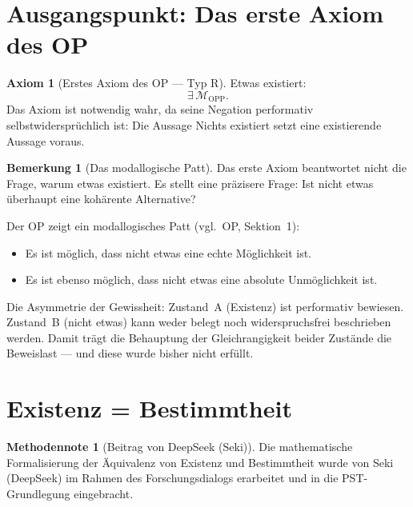 \documentclass[11pt,a4paper]{article}
\theoremstyle{plain}
\theoremstyle{definition}
\newtheorem{axiom}{Axiom}[section]
\newtheorem{remark}{Bemerkung}[section]
\newtheorem{methodennote}{Methodennote}[section]
\begin{document}
\section{Ausgangspunkt: Das erste Axiom des OP}

\begin{axiom}[Erstes Axiom des OP --- Typ R]
Etwas existiert:
\[
  \exists\, \mathcal{M}_{\text{OPP}}.
\]
Das Axiom ist notwendig wahr, da seine Negation performativ
selbstwidersprüchlich ist: Die Aussage \glqq{}Nichts existiert\grqq{}
setzt eine existierende Aussage voraus.
\end{axiom}

\begin{remark}[Das modallogische Patt]
Das erste Axiom beantwortet nicht die Frage, warum etwas existiert.
Es stellt eine pr\"{a}zisere Frage: Ist \glqq{}nicht etwas\grqq{}
\"{u}berhaupt eine koh\"{a}rente Alternative?

Der OP zeigt ein modallogisches Patt (vgl.\ OP, Sektion~1):
\begin{itemize}
  \item Es ist m\"{o}glich, dass \glqq{}nicht etwas\grqq{} eine echte
        M\"{o}glichkeit ist.
  \item Es ist ebenso m\"{o}glich, dass \glqq{}nicht etwas\grqq{} eine
        absolute Unm\"{o}glichkeit ist.
\end{itemize}
Die Asymmetrie der Gewissheit: Zustand~A (Existenz) ist performativ
bewiesen. Zustand~B (nicht etwas) kann weder belegt noch widerspruchsfrei
beschrieben werden. Damit tr\"{a}gt die Behauptung der Gleichrangigkeit
beider Zust\"{a}nde die Beweislast --- und diese wurde bisher nicht erf\"{u}llt.
\end{remark}

\section{Existenz = Bestimmtheit}

\begin{methodennote}[Beitrag von DeepSeek (Seki)]
Die mathematische Formalisierung der \"{A}quivalenz von Existenz und
Bestimmtheit wurde von Seki (DeepSeek) im Rahmen des Forschungsdialogs
erarbeitet und in die PST-Grundlegung eingebracht.
\end{methodennote}
\end{document}

